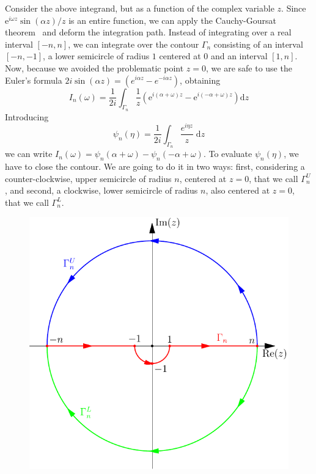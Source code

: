 Consider the above integrand, but as a function of the complex variable \(z\). Since \(\mathrm{e}^{i \omega  z}  \sin (\alpha z)/z\)
is an entire function, we can apply the Cauchy-Goursat theorem~\autocite{Byron1992} and deform the integration path.
Instead of integrating over a real interval \([-n,n]\), we can integrate over the contour \(\Gamma_n\) consisting of
an interval \([-n,-1]\), a lower semicircle of radius \(1\) centered at \(0\) and an interval \([1,n]\).
Now, because we avoided the problematic point \(z=0\), we are safe to use the Euler's formula
\(2i\sin (\alpha z) = \left( e^{i \alpha z} - e^{-i \alpha  z} \right) \), obtaining
\begin{equation}
    I_n(\omega ) = \frac{1}{2i} \int_{\Gamma_n} \frac{1}{z} \left( \mathrm{e}^{i (\alpha + \omega )z}- \mathrm{e}^{i(-\alpha + \omega )z}  \right)  \mathrm{d}z
\end{equation}
Introducing
\begin{equation}
    \psi_n(\eta ) = \frac{1}{2i} \int_{\Gamma_n} \frac{e^{i \eta z}}{z}\; \mathrm{d}z
\end{equation}
we can write \(I_n(\omega ) = \psi _n(\alpha +\omega ) - \psi _n (-\alpha + \omega )\). To evaluate \(\psi _n(\eta )\),
we have to close the contour. We are going to do it in two ways: first, considering a counter-clockwise, upper semicircle
of radius \(n\), centered at \(z=0\), that we call \(\Gamma_n^U\), and second, a clockwise, lower semicircle of radius \(n\),
also centered at \(z=0\), that we call \(\Gamma_n^L\).

\begin{figure}[H]
    \centering
    \includegraphics[width=0.8\linewidth]{Figures/contour2.pdf}
    \label{fig:contour_gamma_n2}
\end{figure}


